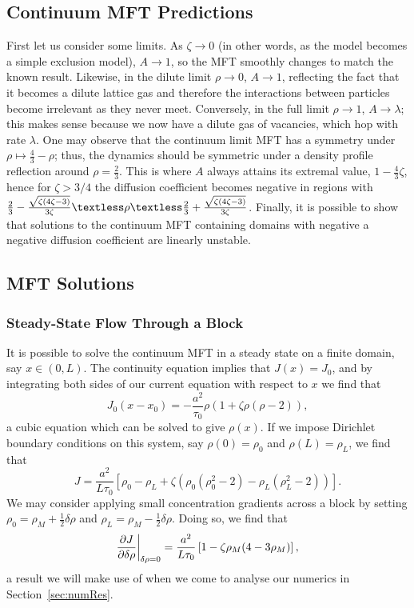 \subsection{Continuum MFT Predictions}
First let us consider some limits. As $\zeta \rightarrow 0$ (in other words, as the model becomes a simple exclusion model), $A \rightarrow 1$, so the MFT smoothly changes to match the known result. Likewise, in the
dilute limit $\rho \rightarrow 0$, $A \rightarrow 1$, reflecting the fact that it becomes a dilute lattice gas and therefore the interactions between particles become irrelevant as they never meet.
Conversely, in the full limit $\rho \rightarrow 1$, $A \rightarrow \lambda$; this makes sense because we now have a dilute gas of vacancies, which hop with rate $\lambda$.
One may observe that the continuum limit MFT has a symmetry under $\rho \mapsto \frac{4}{3} - \rho$; thus, the dynamics should be symmetric under a density profile reflection around $\rho = \frac{2}{3}$. This is where $A$ always
attains its extremal value, $ 1 - \frac{4}{3}\zeta$, hence for $\zeta>3/4$ the diffusion coefficient becomes negative in regions with
$\frac{2}{3} - \frac{\sqrt{\zeta\left(4\zeta - 3\right)}}{3\zeta} \textless \rho \textless \frac{2}{3} + \frac{\sqrt{\zeta\left(4\zeta - 3\right)}}{3\zeta}$.
Finally, it is possible to show that solutions to the continuum MFT containing domains with negative a negative diffusion coefficient are linearly unstable.
\subsection{MFT Solutions}
\subsubsection{Steady-State Flow Through a Block}
It is possible to solve the continuum MFT in a steady state on a finite domain, say $x\in(0, L)$. The continuity equation implies that $J(x)=J_0$, and by integrating both sides of our current equation with respect to $x$ we find that
\begin{equation}
 J_0 (x-x_0) = -\frac{a^2}{\tau_0} \rho \left(1+\zeta \rho\left(\rho-2\right)\right),
\end{equation}
a cubic equation which can be solved to give $\rho(x)$. If we impose Dirichlet boundary conditions on this system, say $\rho(0)=\rho_0$ and $\rho(L)=\rho_L$, we find that
\begin{equation}
 J = \frac{a^2}{L \tau_0} \left[ \rho_0 - \rho_L + \zeta \left( \rho_0\left(\rho_0^2-2\right) - \rho_L\left(\rho_L^2-2\right) \right) \right].
\end{equation}
We may consider applying small concentration gradients across a block by setting $\rho_0 = \rho_M + \frac{1}{2}\delta\rho$ and $\rho_L = \rho_M - \frac{1}{2}\delta\rho$. Doing so, we find that
\begin{equation}
\label{eq:MFTflow}
 \frac{\partial J}{\partial \delta\rho}\bigg|_{\delta\rho=0} = \frac{a^2}{L \tau_0} \left[ 1 - \zeta\rho_M(4-3\rho_M) \right],
\end{equation}
a result we will make use of when we come to analyse our numerics in Section~\ref{sec:numRes}.
